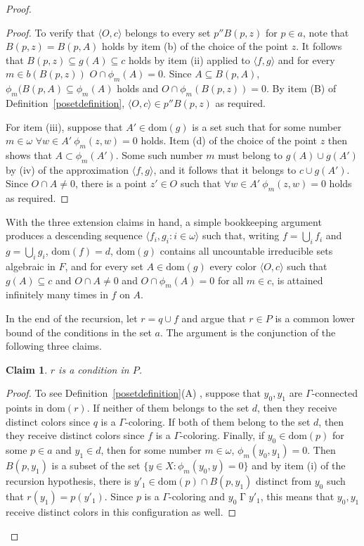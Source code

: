 \documentclass{article}
\newcommand{\gw}{\omega}
\newcommand{\dom}{\mathrm{dom}}
\newtheorem{claim}[theorem]{Claim}
\theoremstyle{definition}
\begin{document}
\begin{proof}
\begin{proof}
To verify that $\langle O, c\rangle$ belongs to every set $p''B(p, z)$ for $p\in a$, note that $B(p, z)=B(p, A)$ holds by item (b) of the choice of the point $z$. It follows that $B(p, z)\subseteq g(A)\subseteq c$ holds by item (ii) applied to $\langle f, g\rangle$ and for every $m\in b(B(p, z))$ $O\cap\phi_m(A)=0$. Since $A\subseteq B(p, A)$, $\phi_m(B(p, A)\subseteq \phi_m(A)$ holds and $O\cap \phi_m(B(p, z))=0$. By item (B) of Definition~\ref{posetdefinition}, $\langle O,c\rangle\in p''B(p, z)$ as required.

For item (iii), suppose that $A'\in\dom(g)$ is a set such that for some number $m\in\gw$ $\forall w\in A'\ \phi_m(z, w)=0$ holds. Item (d) of the choice of the point $z$ then shows that $A\subset\phi_m(A')$. Some such number $m$ must belong to $g(A)\cup g(A')$ by (iv) of the approximation $\langle f, g\rangle$, and it follows that it belongs to $c\cup g(A')$. Since $O\cap A\neq 0$, there is a point $z'\in O$ such that $\forall w\in A'\ \phi_m(z, w)=0$ holds as required.
\end{proof}


With the three extension claims in hand, a simple bookkeeping argument produces a descending sequence $\langle f_i, g_i\colon i\in\gw\rangle$ such that, writing $f=\bigcup_i f_i$ and $g=\bigcup_ig_i$, $\dom(f)=d$, $\dom(g)$ contains all uncountable irreducible sets algebraic in $F$, and for every set $A\in\dom(g)$ every color $\langle O, c\rangle$ such that $g(A)\subseteq c$ and $O\cap A\neq 0$ and $O\cap \phi_m(A)=0$ for all $m\in c$, is attained infinitely many times in $f$ on $A$.

In the end of the recursion, let $r=q\cup f$ and argue that $r\in P$ is a common lower bound of the conditions in the set $a$. The argument is the conjunction of the following three claims.

\begin{claim}
$r$ is a condition in $P$.
\end{claim}

\begin{proof} 
To see Definition~\ref{posetdefinition}(A) , suppose that $y_0, y_1$ are $\Gamma$-connected points in $\dom(r)$. If neither of them belongs to the set $d$, then they receive distinct colors since $q$ is a $\Gamma$-coloring. If both of them belong to the set $d$, then they receive distinct colors since $f$ is a $\Gamma$-coloring. Finally, if $y_0\in\dom(p)$ for some $p\in a$ and $y_1\in d$, then for some number $m\in\gw$, $\phi_m(y_0, y_1)=0$. Then $B(p, y_1)$ is a subset of the set $\{y\in X\colon \phi_m(y_0, y)=0\}$ and by item (i) of the recursion hypothesis, there is $y'_1\in\dom(p)\cap B(p, y_1)$ distinct from $y_0$ such that $r(y_1)=p(y'_1)$. Since $p$ is a $\Gamma$-coloring and $y_0\mathrel\Gamma y'_1$, this means that $y_0, y_1$ receive distinct colors in this configuration as well.


\end{proof}
\end{proof}
\end{document}

